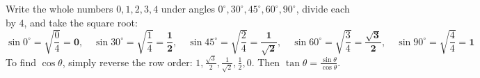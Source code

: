 \documentclass[10pt,a4paper]{article}
\begin{document}
\begin{formulaBox}[title=5-Second Table Reconstruction Protocol,fonttitle=\bfseries\color{navy}]
  Write the whole numbers $0, 1, 2, 3, 4$ under angles $0^\circ, 30^\circ, 45^\circ, 60^\circ, 90^\circ$, divide each by $4$, and take the square root:
  $$\sin 0^\circ = \sqrt{\frac{0}{4}} = \mathbf{0}, \quad \sin 30^\circ = \sqrt{\frac{1}{4}} = \mathbf{\frac{1}{2}}, \quad \sin 45^\circ = \sqrt{\frac{2}{4}} = \mathbf{\frac{1}{\sqrt{2}}}, \quad \sin 60^\circ = \sqrt{\frac{3}{4}} = \mathbf{\frac{\sqrt{3}}{2}}, \quad \sin 90^\circ = \sqrt{\frac{4}{4}} = \mathbf{1}$$
  To find $\cos\theta$, simply reverse the row order: $1, \frac{\sqrt{3}}{2}, \frac{1}{\sqrt{2}}, \frac{1}{2}, 0$. Then $\tan\theta = \frac{\sin\theta}{\cos\theta}$.
\end{formulaBox}
\end{document}

